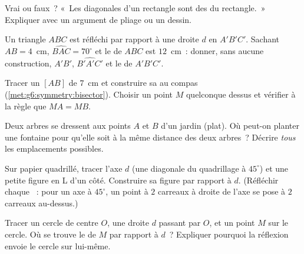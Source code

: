 \begin{exercise}[$\star$]\label{exo:g6:symmetry:5}
Vrai ou faux~? «~Les diagonales d'un rectangle sont des  du rectangle.~» Expliquer avec un argument de pliage ou un
dessin.
\end{exercise}

\begin{exercise}[$\star$]\label{exo:g6:symmetry:6}
Un triangle $ABC$ est réfléchi par rapport à une droite $d$ en
$A'B'C'$. Sachant $AB = 4$~cm, $\widehat{BAC} = 70^\circ$ et le
 de $ABC$ est $12$~cm~: donner, sans aucune construction,
$A'B'$, $\widehat{B'A'C'}$ et le  de $A'B'C'$.
\end{exercise}

\begin{exercise}[$\star$]\label{exo:g6:symmetry:7}
Tracer un  $[AB]$ de $7$~cm et construire sa  au
compas (\cref{met:g6:symmetry:bisector}). Choisir un point $M$
quelconque dessus et vérifier à la règle que $MA = MB$.
\end{exercise}

\begin{exercise}[$\star\star$]\label{exo:g6:symmetry:8}
Deux arbres se dressent aux points $A$ et $B$ d'un jardin (plat). Où
peut-on planter une fontaine pour qu'elle soit à la même distance des
deux arbres~? Décrire \emph{tous} les emplacements possibles.
\end{exercise}

\begin{exercise}[$\star\star$]\label{exo:g6:symmetry:9}
Sur papier quadrillé, tracer l'axe $d$ (une diagonale du quadrillage à
$45^\circ$) et une petite figure en L d'un côté. Construire sa
figure  par rapport à $d$. (Réfléchir chaque ~: pour un
axe à $45^\circ$, un point à $2$ carreaux à droite de l'axe se pose à
$2$ carreaux au-dessus.)
\end{exercise}

\begin{exercise}[$\star\star$]\label{exo:g6:symmetry:10}
Tracer un cercle de centre $O$, une droite $d$ passant par $O$, et un
point $M$ sur le cercle. Où se trouve le  de $M$ par rapport
à $d$~? Expliquer pourquoi la réflexion envoie le cercle sur
lui-même.
\end{exercise}

